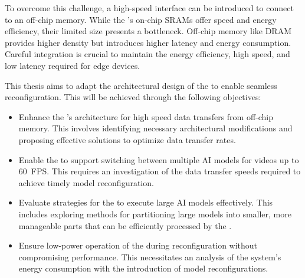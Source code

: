 To overcome this challenge, a high-speed interface can be introduced to connect to an off-chip memory.
While the \graicore{}'s on-chip SRAMs offer speed and energy efficiency, their limited size presents a bottleneck.
Off-chip memory like DRAM provides higher density but introduces higher latency and energy consumption.
Careful integration is crucial to maintain the energy efficiency, high speed, and low latency required for edge devices.

This thesis aims to adapt the architectural design of the \graicore{} to enable seamless reconfiguration.
This will be achieved through the following objectives:
\begin{itemize}
    \item
    Enhance the \graicore{}'s architecture for high speed data transfers from off-chip memory.
    This involves identifying necessary architectural modifications and proposing effective solutions to optimize data transfer rates.
    \item
    Enable the \graicore{} to support switching between multiple AI models for videos up to \SI{60}{FPS}.
    This requires an investigation of the data transfer speeds required to achieve timely model reconfiguration.
    \item
    Evaluate strategies for the \graicore{} to execute large AI models effectively.
    This includes exploring methods for partitioning large models into smaller, more manageable parts that can be efficiently processed by the \graicore{}.
    \item
    Ensure low-power operation of the \graicore{} during reconfiguration without compromising performance.
    This necessitates an analysis of the system's energy consumption with the introduction of model reconfigurations.
\end{itemize}